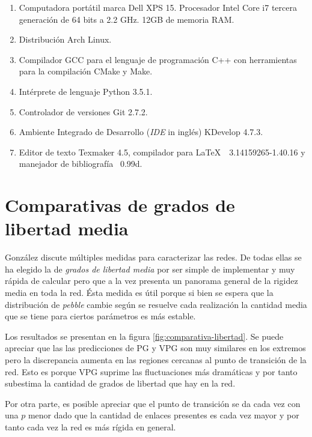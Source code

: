 \begin{enumerate}
	\item Computadora portátil marca Dell XPS 15. Procesador Intel Core i7 tercera generación de 64 bits a 2.2 GHz. 12GB de memoria RAM.
	\item Distribución Arch Linux.
	\item Compilador GCC para el lenguaje de programación C++ con herramientas para la compilación CMake y Make.
	\item Intérprete de lenguaje Python 3.5.1.
	\item Controlador de versiones Git 2.7.2.
	\item Ambiente Integrado de Desarrollo (\emph{IDE} in inglés) KDevelop 4.7.3.
	\item Editor de texto Texmaker 4.5, compilador para \LaTeX\ \ 3.14159265-1.40.16 y manejador de bibliografía \BibTeX\ 0.99d.
\end{enumerate}

\section{Comparativas de grados de libertad media}
González\parencite{Gonzalez2011} discute múltiples medidas para caracterizar las redes. De todas ellas se ha elegido la de \emph{grados de libertad media} por ser simple de implementar y muy rápida de calcular pero que a la vez presenta un panorama general de la rigidez media en toda la red. Ésta medida es útil porque si bien se espera que la distribución de \emph{pebble} cambie según se resuelve cada realización la cantidad media que se tiene para ciertos parámetros es más estable.


Los resultados se presentan en la figura \ref{fig:comparativa-libertad}. Se puede apreciar que las las predicciones de PG y VPG son muy similares en los extremos pero la discrepancia aumenta en las regiones cercanas al punto de transición de la red. Esto es porque VPG suprime las fluctuaciones más dramáticas y por tanto subestima la cantidad de grados de libertad que hay en la red.

Por otra parte, es posible apreciar que el punto de transición se da cada vez con una $p$ menor dado que la cantidad de enlaces presentes es cada vez mayor y por tanto cada vez la red es más rígida en general.

